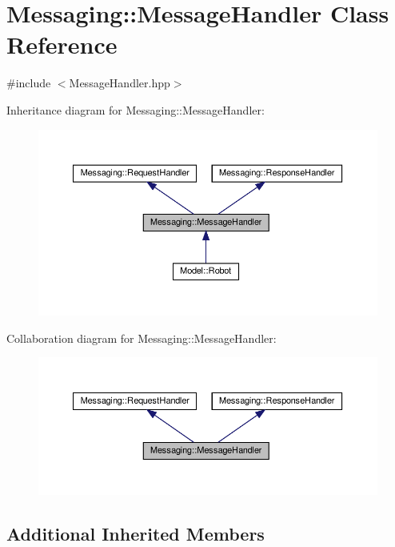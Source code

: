 \hypertarget{class_messaging_1_1_message_handler}{}\section{Messaging\+:\+:Message\+Handler Class Reference}
\label{class_messaging_1_1_message_handler}


{\ttfamily \#include $<$Message\+Handler.\+hpp$>$}



Inheritance diagram for Messaging\+:\+:Message\+Handler\+:
\nopagebreak
\begin{figure}[H]
\begin{center}
\leavevmode
\includegraphics[width=350pt]{class_messaging_1_1_message_handler__inherit__graph}
\end{center}
\end{figure}


Collaboration diagram for Messaging\+:\+:Message\+Handler\+:
\nopagebreak
\begin{figure}[H]
\begin{center}
\leavevmode
\includegraphics[width=350pt]{class_messaging_1_1_message_handler__coll__graph}
\end{center}
\end{figure}
\subsection*{Additional Inherited Members}


